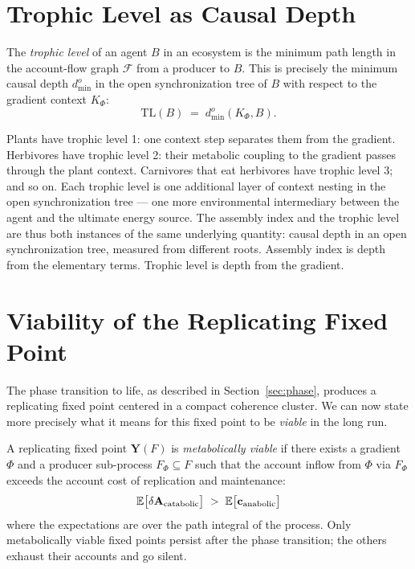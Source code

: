 \section{Trophic Level as Causal Depth}

\begin{proposition}
\label{prop:trophic}
The \emph{trophic level} of an agent $B$ in an ecosystem is
the minimum path length in the account-flow graph $\mathcal{F}$
from a producer to $B$.
This is precisely the minimum causal depth $d^o_{\min}$ in the
open synchronization tree of $B$ with respect to the gradient
context $K_\Phi$:
\[
  \mathrm{TL}(B) \;=\; d^o_{\min}(K_\Phi, B).
\]
\end{proposition}

\begin{remark}
Plants have trophic level 1: one context step separates them
from the gradient.
Herbivores have trophic level 2: their metabolic coupling to
the gradient passes through the plant context.
Carnivores that eat herbivores have trophic level 3; and so on.
Each trophic level is one additional layer of context nesting
in the open synchronization tree --- one more environmental
intermediary between the agent and the ultimate energy source.
The assembly index and the trophic level are thus both instances
of the same underlying quantity: causal depth in an open
synchronization tree, measured from different roots.
Assembly index is depth from the elementary terms.
Trophic level is depth from the gradient.
\end{remark}

\section{Viability of the Replicating Fixed Point}

The phase transition to life, as described in
Section~\ref{sec:phase}, produces a replicating fixed point
centered in a compact coherence cluster.
We can now state more precisely what it means for this fixed
point to be \emph{viable} in the long run.

\begin{conjecture}
\label{conj:viable}
A replicating fixed point $\mathbf{Y}(F)$ is \emph{metabolically
viable} if there exists a gradient $\Phi$ and a producer
sub-process $F_\Phi \subseteq F$ such that the account inflow
from $\Phi$ via $F_\Phi$ exceeds the account cost of replication
and maintenance:
\[
  \mathbb{E}\bigl[\delta\mathbf{A}_{\text{catabolic}}\bigr]
  \;>\;
  \mathbb{E}\bigl[\mathbf{c}_{\text{anabolic}}\bigr]
\]
where the expectations are over the path integral of the process.
Only metabolically viable fixed points persist after the phase
transition; the others exhaust their accounts and go silent.
\end{conjecture}

